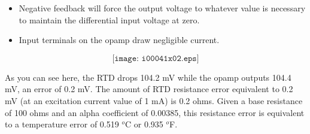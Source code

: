 \begin{itemize}
\item{} Negative feedback will force the output voltage to whatever value is necessary to maintain the differential input voltage at zero.
\item{} Input terminals on the opamp draw negligible current.
\end{itemize}

$$\texttt{[image: i00041x02.eps]}$$

As you can see here, the RTD drops 104.2 mV while the opamp outputs 104.4 mV, an error of 0.2 mV.  The amount of RTD resistance error equivalent to 0.2 mV (at an excitation current value of 1 mA) is 0.2 ohms.  Given a base resistance of 100 ohms and an alpha coefficient of 0.00385, this resistance error is equivalent to a temperature error of 0.519 $^{o}$C or 0.935 $^{o}$F.





